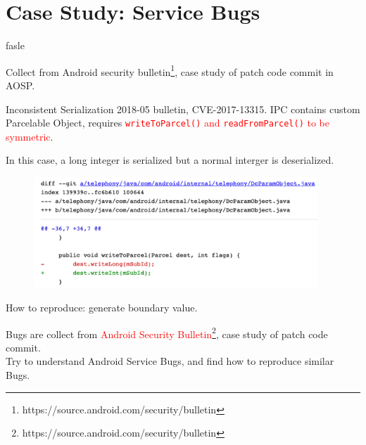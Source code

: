 \documentclass[notheorems, aspectratio=54]{beamer}
\begin{document}
\section{Case Study: Service Bugs}

\if fasle
\begin{frame}
	
	Collect from Android security bulletin\footnote{\tiny{https://source.android.com/security/bulletin}}, case study of patch code commit in AOSP.
	
	\begin{block}{Inconsistent Serialization}
		2018-05 bulletin, CVE-2017-13315. IPC contains custom Parcelable Object, requires \textcolor{red}{\texttt{writeToParcel()} and \texttt{readFromParcel()} to be symmetric}.
		
		In this case, a long integer is serialized but a normal interger is deserialized.
		\begin{figure}
			\centering
			\includegraphics[width=0.95\textwidth]{res/case-study-inconsistent-serialization.png}
			\vspace*{-0.3cm}
		\end{figure}
	\end{block}

	How to reproduce: generate boundary value.
	
\end{frame}
\fi

\begin{frame}
	
	Bugs are collect from \textcolor{red}{Android Security Bulletin}\footnote{\tiny{https://source.android.com/security/bulletin}}, case study of patch code commit.
	\\[2ex]
	Try to understand Android Service Bugs, and find how to reproduce similar Bugs.  
\end{frame}
\end{document}
